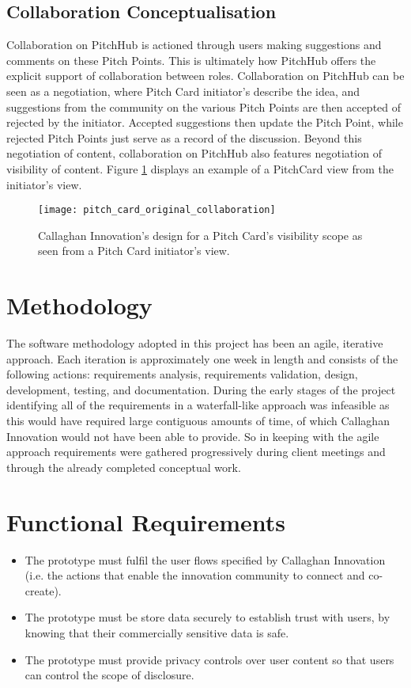\subsection{Collaboration Conceptualisation}
Collaboration on PitchHub is actioned through users making suggestions and comments on these Pitch Points. This is ultimately how PitchHub offers the explicit support of collaboration between roles. Collaboration on PitchHub can be seen as a negotiation, where Pitch Card initiator's describe the idea, and suggestions from the community on the various Pitch Points are then accepted of rejected by the initiator. Accepted suggestions then update the Pitch Point, while rejected Pitch Points just serve as a record of the discussion. Beyond this negotiation of content, collaboration on PitchHub also features negotiation of visibility of content. Figure \ref{fig:pitch_card_original_collaboration} displays an example of a PitchCard view from the initiator's view.
\begin{figure}[ht]
    \centering
    \texttt{[image: pitch\_card\_original\_collaboration]}
    \caption{Callaghan Innovation's design for a Pitch Card's visibility scope as seen from a Pitch Card initiator's view.}
    \label{fig:pitch_card_original_collaboration}
\end{figure}

\section{Methodology}
The software methodology adopted in this project has been an agile, iterative approach. Each iteration is approximately one week in length and consists of the following actions: requirements analysis, requirements validation, design, development, testing, and documentation. During the early stages of the project identifying all of the requirements in a waterfall-like approach was infeasible as this would have required large contiguous amounts of time, of which Callaghan Innovation would not have been able to provide. So in keeping with the agile approach requirements were gathered progressively during client meetings and through the already completed conceptual work. 

\section{Functional Requirements}
\begin{itemize}
\item The prototype must fulfil the user flows specified by Callaghan Innovation (i.e. the actions that enable the innovation community to connect and co-create).
\item The prototype must be store data securely to establish trust with users, by knowing that their commercially sensitive data is safe.
\item The prototype must provide privacy controls over user content so that users can control the scope of disclosure.
\end{itemize}

